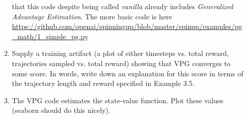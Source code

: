\documentclass{article}
\begin{document}
\begin{enumerate}
\begin{enumerate}
    that this code despite being called {\em vanilla} already includes {\em Generalized Advantage Estimation}. The more basic code is here \url{https://github.com/openai/spinningup/blob/master/spinup/examples/pg_math/1_simple_pg.py}
  \item Supply a training artifact (a plot of either timesteps vs. total reward, trajectories sampled vs. total reward) showing that VPG converges to some score. In words, write down an explanation
    for this score in terms of the trajectory length and reward specified in Example 3.5.
  \item The VPG code estimates the state-value function. Plot these values (seaborn should do this nicely).
  \end{enumerate}
\end{enumerate}
\end{document}
